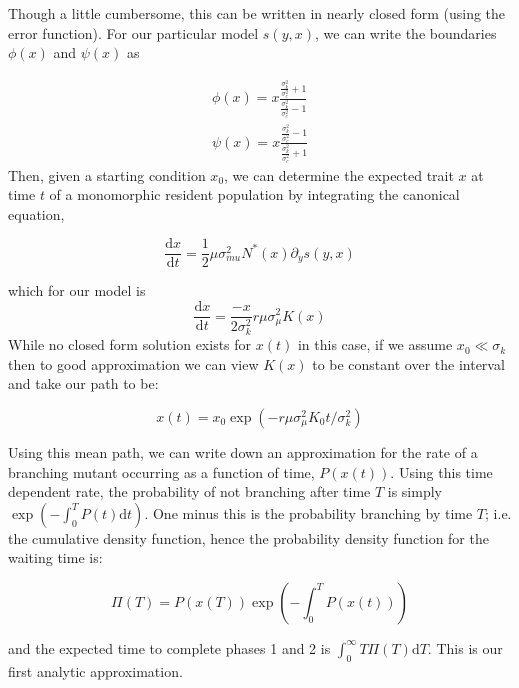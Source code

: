 \documentclass[letterpaper,10pt]{article}
\newcommand{\ud}{\mathrm{d}}
\begin{document}
Though a little cumbersome, this can be written in nearly closed form (using the error function). For our particular model $s(y,x)$, we can write the boundaries $\phi(x)$ and $\psi(x)$ as 

\begin{align}
\phi(x) = x\frac{\frac{\sigma_k^2}{\sigma_c^2}+1}{\frac{\sigma_k^2}{\sigma_c^2}-1} \nonumber \\
\psi(x) = x\frac{\frac{\sigma_k^2}{\sigma_c^2}-1}{\frac{\sigma_k^2}{\sigma_c^2}+1}
\label{phipsi}
\end{align}
Then, given a starting condition $x_0$, we can determine the expected trait $x$ at time $t$ of a monomorphic resident population by integrating the canonical equation,

\begin{equation}
\frac{\ud x}{\ud t} = \frac{1}{2} \mu \sigma_{mu}^2 N^*(x) \partial_y s(y,x)
\end{equation}

which for our model is  
\begin{equation}
\frac{\ud x}{\ud t} = \frac{-x}{2\sigma_k^2} r \mu \sigma_{\mu}^2 K(x) 
\end{equation}
While no closed form solution exists for $x(t)$ in this case, if we assume $x_0 \ll \sigma_k$ then to good approximation we can view $K(x)$ to be constant over the interval and take our path to be:

\begin{equation}
x(t) = x_0 \exp\left( -r \mu \sigma_{\mu}^2 K_0 t/\sigma_k^2\right)
\end{equation}

Using this mean path, we can write down an approximation for the rate of a branching mutant occurring as a function of time, $P(x(t))$.  Using this time dependent rate, the probability of not branching after time $T$ is simply $\exp\left( - \int_0^T P(t)\ud t \right)$.  One minus this is the probability branching by time $T$; i.e. the cumulative density function, hence the probability density function for the waiting time is:

\begin{equation}
\Pi(T) = P(x(T)) \exp\left( -\int_0^T P(x(t)) \right)
\label{pdf}
\end{equation}

and the expected time to complete phases 1 and 2 is $\int_0^{\infty} T \Pi(T) \ud T$. This is our first analytic approximation.  
\end{document}
